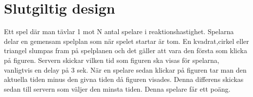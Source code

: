 \documentclass[a4paper]{article}
\begin{document}
\section{Slutgiltig design}
Ett spel där man tävlar 1 mot N antal spelare i reaktionshastighet. Spelarna delar en gemensam spelplan som när spelet startar är tom. En kvadrat,cirkel eller triangel slumpas fram på spelplanen och det gäller att vara den första som klicka på figuren. Servern skickar vilken tid som figuren ska visas för spelarna, vanligtvis en delay på 3 sek. När en spelare sedan klickar på figuren tar man den aktuella tiden minus den givna tiden då figuren visades. Denna differens skickas sedan till servern som väljer den minsta tiden. Denna spelare får ett poäng.
\end{document}
